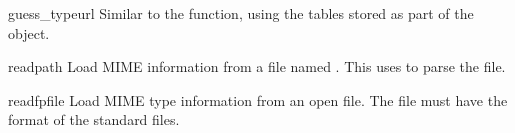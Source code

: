 \begin{methoddesc}{guess_type}{url}
  Similar to the  function, using the tables
  stored as part of the object.
\end{methoddesc}

\begin{methoddesc}{read}{path}
  Load MIME information from a file named .  This uses
   to parse the file.
\end{methoddesc}

\begin{methoddesc}{readfp}{file}
  Load MIME type information from an open file.  The file must have
  the format of the standard  files.
\end{methoddesc}
